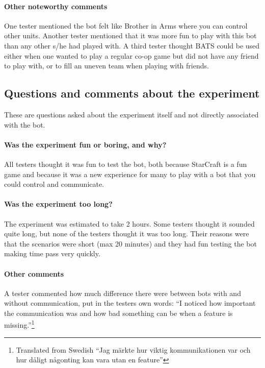 \paragraph{Other noteworthy comments}
One tester mentioned the bot felt like Brother in Arms where you can control other units. Another
tester mentioned that it was more fun to play with this bot than any other s/he had played with. A
third tester thought BATS could be used either when one wanted to play a regular co-op game but did
not have any friend to play with, or to fill an uneven team when playing with friends.

\subsection{Questions and comments about the experiment}
These are questions asked about the experiment itself and not directly associated with the bot.

\paragraph{Was the experiment fun or boring, and why?}
All testers thought it was fun to test the bot, both because StarCraft is a fun game and because it
was a new experience for many to play with a bot that you could control and communicate.

\paragraph{Was the experiment too long?}
The experiment was estimated to take 2 hours. Some testers thought it sounded quite long, but none
of the testers thought it was too long. Their reasons were that the scenarios were short (max 20
minutes) and they had fun testing the bot making time pass very quickly.

\paragraph{Other comments}
A tester commented how much difference there were between bots with and without communication, put
in the testers own words: ``I noticed how important the communication was and how bad something can
be when a feature is missing.''\footnote{Translated from Swedish ``Jag märkte hur viktig
kommunikationen var och hur dåligt någonting kan vara utan en feature''}
